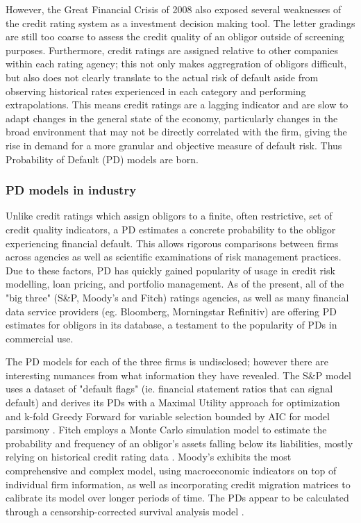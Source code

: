 \documentclass[10pt]{article}
\begin{document}
\begin{multicols*}{2}
However, the Great Financial Crisis of 2008 also exposed several weaknesses of the credit rating system as a investment decision making tool. The letter gradings are still too coarse to assess the credit quality of an obligor outside of screening purposes.
Furthermore, credit ratings are assigned relative to other companies within each rating agency; this not only makes aggregration of obligors difficult, but also does not clearly translate to the actual risk of default aside from observing historical rates experienced in each category and performing extrapolations.
This means credit ratings are a lagging indicator and are slow to adapt changes in the general state of the economy, particularly changes in the broad environment that may not be directly correlated with the firm, giving the rise in demand for a more granular and objective measure of default risk.
Thus Probability of Default (PD) models are born.
    
\subsubsection{PD models in industry}\label{industry}

Unlike credit ratings which assign obligors to a finite, often restrictive, set of credit quality indicators, a PD estimates a concrete probability to the obligor experiencing financial default.
This allows rigorous comparisons between firms across agencies as well as scientific examinations of risk management practices. Due to these factors, PD has quickly gained popularity of usage in credit risk modelling, loan pricing, and portfolio management.
As of the present, all of the "big three" (S\&P, Moody's and Fitch) ratings agencies, as well as many financial data service providers (eg. Bloomberg, Morningstar Refinitiv) are offering PD estimates for obligors in its database, a testament to the popularity of PDs in commercial use.

The PD models for each of the three firms is undisclosed; however there are interesting numances from what information they have revealed. 
The S\&P model uses a dataset of "default flags" (ie. financial statement ratios that can signal default) and derives its PDs with a Maximal Utility approach for optimization and k-fold Greedy Forward for variable selection bounded by AIC for model parsimony \citep{SP-PD-methodology}. 
Fitch employs a Monte Carlo simulation model to estimate the probability and frequency of an obligor's assets falling below its liabilities, mostly relying on historical credit rating data \citep{Fitch-PD-methodology}. 
Moody's exhibits the most comprehensive and complex model, using macroeconomic indicators on top of individual firm information, as well as incorporating credit migration matrices to calibrate its model over longer periods of time. The PDs appear to be calculated through a censorship-corrected survival analysis model \citep{Moodys-PD-methodology}.


\end{multicols*}
\end{document}
